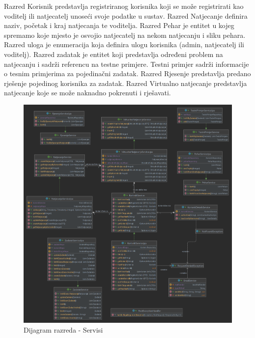 Razred Korisnik predstavlja registriranog korisnika koji se može registrirati kao voditelj ili natjecatelj unoseći svoje podatke u sustav.
Razred Natjecanje definira naziv, početak i kraj natjecanja te voditelja. Razred Pehar je entitet u kojeg spremamo koje mjesto je osvojio natjecatelj na nekom natjecanju i sliku pehara.
Razred uloga je enumeracija koja definira ulogu korisnika (admin, natjecatelj ili voditelj). Razred zadatak je entitet koji predstavlja određeni problem na natjecanju i sadrži referencu na testne primjere.
Testni primjer sadrži informacije o tesnim primjerima za pojedinačni zadatak. Razred Rjesenje predstavlja predano rješenje pojedinog korisnika za zadatak. 
Razred Virtualno natjecanje predstavlja natjecanje koje se može naknadno pokrenuti i rješavati. 

\begin{figure}[H]
	\includegraphics[scale=0.19]{dijagrami/serviceDiagram.png}
	\centering
	\caption{Dijagram razreda - Servisi}
	\label{fig:dijagramRazreda1}
\end{figure}

